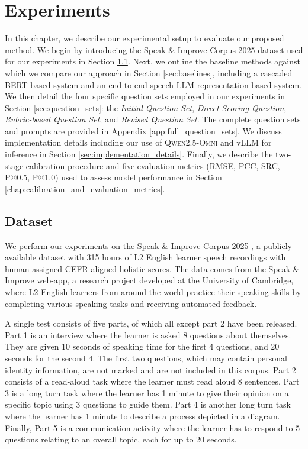 \documentclass{report}
\begin{document}
\chapter{Experiments}
\label{chap:experiments}
In this chapter, we describe our experimental setup to evaluate our proposed method. We begin by introducing the Speak \& Improve Corpus 2025 dataset used for our experiments in Section \ref{sec:dataset}. Next, we outline the baseline methods against which we compare our approach in Section \ref{sec:baselines}, including a cascaded BERT-based system and an end-to-end speech LLM representation-based system. We then detail the four specific question sets employed in our experiments in Section \ref{sec:question_sets}: the \emph{Initial Question Set}, \emph{Direct Scoring Question}, \emph{Rubric-based Question Set}, and \emph{Revised Question Set}. The complete question sets and prompts are provided in Appendix \ref{app:full_question_sets}. We discuss implementation details including our use of \textsc{Qwen2.5-Omni} and vLLM for inference in Section \ref{sec:implementation_details}. Finally, we describe the two-stage calibration procedure and five evaluation metrics (RMSE, PCC, SRC, P@0.5, P@1.0) used to assess model performance in Section \ref{chap:calibration_and_evaluation_metrics}.

\section{Dataset}
\label{sec:dataset}
We perform our experiments on the Speak \& Improve Corpus 2025 \citep{knill2024sandi}, a publicly available dataset with 315 hours of L2 English learner speech recordings with human-assigned CEFR-aligned holistic scores. The data comes from the Speak \& Improve web-app, a research project developed at the University of Cambridge, where L2 English learners from around the world practice their speaking skills by completing various speaking tasks and receiving automated feedback.

A single test consists of five parts, of which all except part 2 have been released. Part 1 is an interview where the learner is asked 8 questions about themselves. They are given 10 seconds of speaking time for the first 4 questions, and 20 seconds for the second 4. The first two questions, which may contain personal identity information, are not marked and are not included in this corpus. Part 2 consists of a read-aloud task where the learner must read aloud 8 sentences. Part 3 is a long turn task where the learner has 1 minute to give their opinion on a specific topic using 3 questions to guide them. Part 4 is another long turn task where the learner has 1 minute to describe a process depicted in a diagram. Finally, Part 5 is a communication activity where the learner has to respond to 5 questions relating to an overall topic, each for up to 20 seconds.
\end{document}
